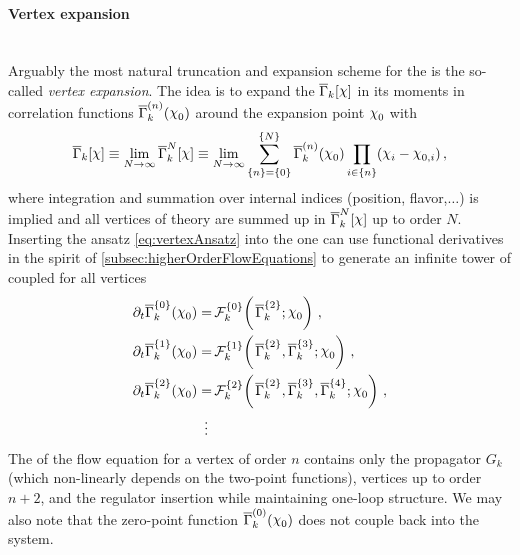 \paragraph{Vertex expansion}\label{paragraph:vertexExpansion}\mbox{} \\
Arguably the most natural truncation and expansion scheme for the \frgEquation{} is the so-called \textit{vertex expansion}.
The idea is to expand the \rgscaledependent{} \eaa{} $\FSeaa_k[\FSmf{\FSsf}]$ in its moments \dash{} in correlation functions \dash{} $\FSeaa_k^{(n)}(\FSmf{\FSsf}_0)$ around the expansion point $\FSmf{\FSsf}_0$ with
\begin{align}
\FSeaa_k[\FSmf{\FSsf}]\equiv\lim_{N\rightarrow\infty}\FSeaa_k^N[\FSmf{\FSsf}]\equiv\lim_{N\rightarrow\infty}\sum_{\{n\}=\{0\}}^{\{N\}} \FSeaa_k^{(n)}(\FSmf{\FSsf}_0)\prod_{i\in \{n\}}(\FSmf{\FSsf}_i-\FSmf{\FSsf}_{0,i})\,,\label{eq:vertexAnsatz}
\end{align}
where integration and summation over internal indices (position, flavor,$\ldots$) is implied and all \ipi{} vertices of theory are summed up in $\FSeaa_k^N[\FSmf{\FSsf}]$ up to order $N$.
Inserting the ansatz \eqref{eq:vertexAnsatz} into the \frgEquation{} one can use functional derivatives in the spirit of \cref{subsec:higherOrderFlowEquations} to generate an infinite tower of coupled \odes{} for all \ipi{} vertices
\begin{subequations}\label{eq:vertexTower}
\begin{align}
	\partial_t\FSeaa_k^{\{0\}}(\FSmf{\FSsf}_0)=&\,\FRGflow_k^{\{0\}}\mkern-3mu\del{\mkern2mu\FSeaa_k^{\{2\}};\FSmf{\FSsf}_0}\,,\\
	\partial_t\FSeaa_k^{\{1\}}(\FSmf{\FSsf}_0)=&\,\FRGflow_k^{\{1\}}\mkern-3mu\del{\mkern2mu\FSeaa_k^{\{2\}},\FSeaa_k^{\{3\}};\FSmf{\FSsf}_0}\,,\\
	\partial_t\FSeaa_k^{\{2\}}(\FSmf{\FSsf}_0)=&\,\FRGflow_k^{\{2\}}\mkern-3mu\del{\mkern2mu\FSeaa_k^{\{2\}},\FSeaa_k^{\{3\}},\FSeaa_k^{\{4\}};\FSmf{\FSsf}_0}\,,\\* %
	\vdots\mkern5mu&\notag
\end{align}
\end{subequations}
The \rhs{} of the flow equation for a \ipi{} vertex of order $n$ contains only the propagator $G_k$ (which non-linearly depends on the two-point functions), \ipi{} vertices up to order $n+2$, and the regulator insertion while maintaining one-loop structure.
We may also note that the zero-point function $\FSeaa_k^{(0)}(\FSmf{\FSsf}_0)$ does not couple back into the system.

